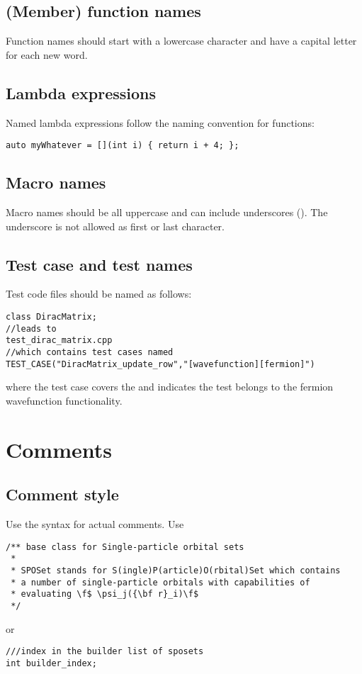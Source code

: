 \subsection{(Member) function names}
Function names should start with a lowercase character and have a capital letter for each new word.

\subsection{Lambda expressions}
Named lambda expressions follow the naming convention for functions:

\begin{lstlisting}[showspaces=false]
auto myWhatever = [](int i) { return i + 4; };
\end{lstlisting}

\subsection{Macro names}
Macro names should be all uppercase and can include underscores (\inlinecode{_}).
The underscore is not allowed as first or last character.

\subsection{Test case and test names}
Test code files should be named as follows:
\begin{lstlisting}[showspaces=false]
class DiracMatrix;
//leads to
test_dirac_matrix.cpp
//which contains test cases named
TEST_CASE("DiracMatrix_update_row","[wavefunction][fermion]")
\end{lstlisting}
where the test case covers the  and  \inlinecode{[wavefunction][fermion]} indicates the test belongs to the fermion wavefunction functionality.

\section{Comments}
\subsection{Comment style}
Use the  syntax for actual comments.
Use
\begin{lstlisting}
/** base class for Single-particle orbital sets
 *
 * SPOSet stands for S(ingle)P(article)O(rbital)Set which contains
 * a number of single-particle orbitals with capabilities of
 * evaluating \f$ \psi_j({\bf r}_i)\f$
 */
\end{lstlisting}
or
\begin{lstlisting}
///index in the builder list of sposets
int builder_index;
\end{lstlisting}

